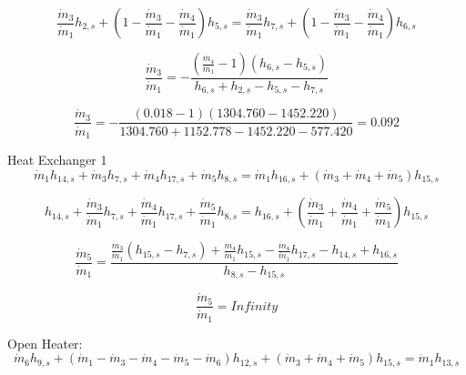 \documentclass{article}
\begin{document}
\begin{equation}
\frac{\dot{m}_{ 3}}{\dot{m}_{ 1}}h_{ 2,s} + (1 - \frac{\dot{m}_{ 3}}{\dot{m}_{ 1}} - \frac{\dot{m}_{ 4}}{\dot{m}_{ 1}})h_{ 5,s} = \frac{\dot{m}_{ 3}}{\dot{m}_{ 1}}h_{ 7,s} + (1 - \frac{\dot{m}_{ 3}}{\dot{m}_{ 1}} - \frac{\dot{m}_{ 4}}{\dot{m}_{ 1}})h_{ 6,s}
\end{equation}

\begin{equation}
\frac{\dot{m}_{3}}{\dot{m}_{1}} = -\frac{(\frac{\dot{m}_{4}}{\dot{m}_{ 1}} - 1)(h_{6,s} - h_{5,s})}{h_{6,s} + h_{2,s} - h_{5,s} - h_{7,s}}
\end{equation}

\begin{equation}
\frac{\dot{m}_{3}}{\dot{m}_{1}} = -\frac{(   0.018 - 1)(1304.760 - 1452.220)}{1304.760 + 1152.778 - 1452.220 -  577.420} =    0.092
\end{equation}


Heat Exchanger 1
\begin{equation}
\dot{m}_{ 1}h_{14,s} + \dot{m}_{ 3}h_{ 7,s} + \dot{m}_{ 4}h_{17,s} + \dot{m}_{ 5}h_{ 8,s} = \dot{m}_{ 1}h_{16,s} + (\dot{m}_{ 3} + \dot{m}_{ 4} + \dot{m}_{ 5})h_{15,s}
\end{equation}

\begin{equation}
h_{14,s} + \frac{\dot{m}_{ 3}}{\dot{m}_{ 1}}h_{ 7,s} + \frac{\dot{m}_{ 4}}{\dot{m}_{ 1}}h_{17,s} + \frac{\dot{m}_{ 5}}{\dot{m}_{ 1}}h_{ 8,s} = h_{16,s} + (\frac{\dot{m}_{ 3}}{\dot{m}_{ 1}} + \frac{\dot{m}_{ 4}}{\dot{m}_{ 1}} + \frac{\dot{m}_{ 5}}{\dot{m}_{ 1}})h_{15,s}
\end{equation}

\begin{equation}
\frac{\dot{m}_{5}}{\dot{m}_{1}} = \frac{\frac{\dot{m}_{3}}{\dot{m}_{1}}(h_{15,s} - h_{7,s}) + \frac{\dot{m}_{4}}{\dot{m}_{1}}h_{15,s} - \frac{\dot{m}_{4}}{\dot{m}_{1}}h_{17,s} - h_{14,s} + h_{16,s}}{h_{8,s} - h_{15,s}}
\end{equation}

\begin{equation}
\frac{\dot{m}_{5}}{\dot{m}_{1}} = Infinity
\end{equation}


Open Heater:
\begin{equation}
\dot{m}_{ 6}h_{ 9,s} + (\dot{m}_{ 1} - \dot{m}_{ 3} - \dot{m}_{ 4} - \dot{m}_{ 5} - \dot{m}_{ 6})h_{12,s} + (\dot{m}_{ 3} + \dot{m}_{ 4} + \dot{m}_{ 5})h_{15,s} = \dot{m}_{ 1}h_{13,s}
\end{equation}
\end{document}
